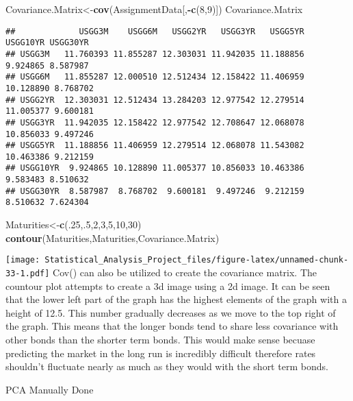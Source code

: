 \documentclass[]{article}
\newenvironment{Shaded}{\begin{snugshade}}{\end{snugshade}}
\newcommand{\KeywordTok}[1]{\textcolor[rgb]{0.13,0.29,0.53}{\textbf{#1}}}
\newcommand{\DecValTok}[1]{\textcolor[rgb]{0.00,0.00,0.81}{#1}}
\newcommand{\OperatorTok}[1]{\textcolor[rgb]{0.81,0.36,0.00}{\textbf{#1}}}
\newcommand{\NormalTok}[1]{#1}
\begin{document}
\begin{Shaded}
\begin{Highlighting}[]
\NormalTok{Covariance.Matrix<-}\KeywordTok{cov}\NormalTok{(AssignmentData[,}\OperatorTok{-}\KeywordTok{c}\NormalTok{(}\DecValTok{8}\NormalTok{,}\DecValTok{9}\NormalTok{)])}
\NormalTok{Covariance.Matrix}
\end{Highlighting}
\end{Shaded}

\begin{verbatim}
##             USGG3M    USGG6M   USGG2YR   USGG3YR   USGG5YR  USGG10YR USGG30YR
## USGG3M   11.760393 11.855287 12.303031 11.942035 11.188856  9.924865 8.587987
## USGG6M   11.855287 12.000510 12.512434 12.158422 11.406959 10.128890 8.768702
## USGG2YR  12.303031 12.512434 13.284203 12.977542 12.279514 11.005377 9.600181
## USGG3YR  11.942035 12.158422 12.977542 12.708647 12.068078 10.856033 9.497246
## USGG5YR  11.188856 11.406959 12.279514 12.068078 11.543082 10.463386 9.212159
## USGG10YR  9.924865 10.128890 11.005377 10.856033 10.463386  9.583483 8.510632
## USGG30YR  8.587987  8.768702  9.600181  9.497246  9.212159  8.510632 7.624304
\end{verbatim}

\begin{Shaded}
\begin{Highlighting}[]
\NormalTok{Maturities<-}\KeywordTok{c}\NormalTok{(.}\DecValTok{25}\NormalTok{,.}\DecValTok{5}\NormalTok{,}\DecValTok{2}\NormalTok{,}\DecValTok{3}\NormalTok{,}\DecValTok{5}\NormalTok{,}\DecValTok{10}\NormalTok{,}\DecValTok{30}\NormalTok{)}
\KeywordTok{contour}\NormalTok{(Maturities,Maturities,Covariance.Matrix)}
\end{Highlighting}
\end{Shaded}

\texttt{[image: Statistical\_Analysis\_Project\_files/figure-latex/unnamed-chunk-33-1.pdf]}
Cov() can also be utilized to create the covariance matrix. The countour
plot attempts to create a 3d image using a 2d image. It can be seen that
the lower left part of the graph has the highest elements of the graph
with a height of 12.5. This number gradually decreases as we move to the
top right of the graph. This means that the longer bonds tend to share
less covariance with other bonds than the shorter term bonds. This would
make sense becuase predicting the market in the long run is incredibly
difficult therefore rates shouldn't fluctuate nearly as much as they
would with the short term bonds.

PCA Manually Done
\end{document}
